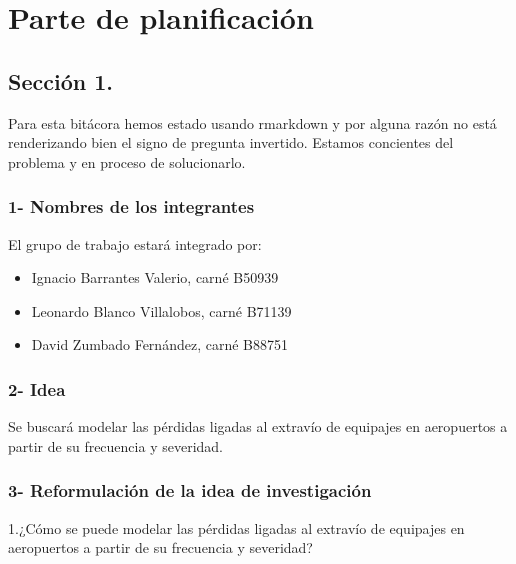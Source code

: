 \documentclass[
  letterpaper,
  onepage,
  openany]{scrreprt}
\begin{document}
\hypertarget{parte-de-planificaciuxf3n}{%
\section{Parte de planificación}\label{parte-de-planificaciuxf3n}}

\hypertarget{secciuxf3n-1.}{%
\subsection{Sección 1.}\label{secciuxf3n-1.}}

Para esta bitácora hemos estado usando rmarkdown y por alguna razón no
está renderizando bien el signo de pregunta invertido. Estamos
concientes del problema y en proceso de solucionarlo.

\hypertarget{nombres-de-los-integrantes}{%
\subsubsection{1- Nombres de los
integrantes}\label{nombres-de-los-integrantes}}

El grupo de trabajo estará integrado por:

\begin{itemize}
\item
  Ignacio Barrantes Valerio, carné B50939
\item
  Leonardo Blanco Villalobos, carné B71139
\item
  David Zumbado Fernández, carné B88751
\end{itemize}

\hypertarget{idea}{%
\subsubsection{2- Idea}\label{idea}}

Se buscará modelar las pérdidas ligadas al extravío de equipajes en
aeropuertos a partir de su frecuencia y severidad.

\hypertarget{reformulaciuxf3n-de-la-idea-de-investigaciuxf3n}{%
\subsubsection{3- Reformulación de la idea de
investigación}\label{reformulaciuxf3n-de-la-idea-de-investigaciuxf3n}}

1.¿Cómo se puede modelar las pérdidas ligadas al extravío de equipajes
en aeropuertos a partir de su frecuencia y severidad?
\end{document}
